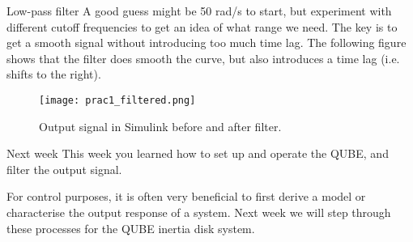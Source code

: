 \documentclass[9pt]{beamer-control}
\begin{document}
\begin{frame}{Low-pass filter}
 A good guess might be 50 rad/s to start, but experiment with different cutoff frequencies to get an idea of what range we need. The key is to get a smooth signal without introducing too much time lag. The following figure shows that the filter does smooth the curve, but also introduces a time lag (i.e. shifts to the right).
\begin{figure}
	\centering
	\texttt{[image: prac1\_filtered.png]}
	\caption{Output signal in Simulink before and after filter.}
\end{figure}
\end{frame}

\begin{frame}{Next week}
	This week you learned how to set up and operate the QUBE, and filter the output signal.
	
	For control purposes, it is often very beneficial to first derive a model or characterise the output response of a system. Next week we will step through these processes for the QUBE inertia disk system.
\end{frame}
\end{document}
